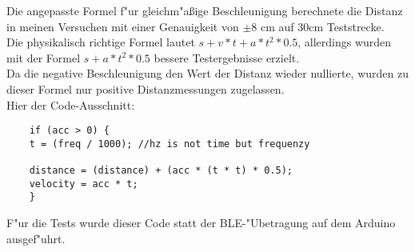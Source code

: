 Die angepasste Formel f"ur gleichm"aßige Beschleunigung berechnete
die Distanz in meinen Versuchen mit einer Genauigkeit von
$\pm8$ cm auf 30cm Teststrecke.\\
Die physikalisch richtige Formel lautet 
$s + v * t  + a * t^2 * 0.5$,
allerdings wurden mit der Formel $s + a * t^2 * 0.5$ 
bessere Testergebnisse erzielt.\\
Da die negative Beschleunigung den Wert der Distanz wieder nullierte,
wurden zu dieser Formel nur positive Distanzmessungen zugelassen.\\
Hier der Code-Ausschnitt:
\begin{verbatim}
    if (acc > 0) {
    t = (freq / 1000); //hz is not time but frequenzy

    distance = (distance) + (acc * (t * t) * 0.5);
    velocity = acc * t;
    }
\end{verbatim}
F"ur die Tests wurde dieser Code statt der BLE-"Ubetragung auf dem Arduino ausgef"uhrt.